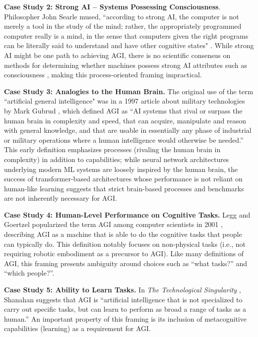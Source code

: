 \documentclass{article}
\theoremstyle{plain}
\theoremstyle{definition}
\theoremstyle{remark}
\begin{document}
\textbf{Case Study 2: Strong AI -- Systems Possessing Consciousness}. Philosopher John Searle mused, ``according to strong AI, the computer is not merely a tool in the study of the mind; rather, the appropriately programmed computer really is a mind, in the sense that computers given the right programs can be literally said to understand and have other cognitive states" \citep{searle_1980}. While strong AI might be one path to achieving AGI, there is no scientific consensus on methods for determining whether machines possess strong AI attributes such as consciousness \citep{butlin2023consciousness}, making this process-oriented framing impractical.  

\textbf{Case Study 3: Analogies to the Human Brain.} The original use of the term ``artificial general intelligence" was in a 1997 article about military technologies by Mark Gubrud \citep{gubrudAGI}, which defined AGI as “AI systems that rival or surpass the human brain in complexity and speed, that can acquire, manipulate and reason with general knowledge, and that are usable in essentially any phase of industrial or military operations where a human intelligence would otherwise be needed.” This early definition emphasizes processes (rivaling the human brain in complexity) in addition to capabilities; while neural network architectures underlying modern ML systems are loosely inspired by the human brain, the success of transformer-based architectures \citep{vaswani2023attention} whose performance is not reliant on human-like learning suggests that strict brain-based processes and benchmarks are not inherently necessary for AGI. 

\textbf{Case Study 4: Human-Level Performance on Cognitive Tasks.} Legg \citep{leggThesis} and Goertzel \citep{goertzel} popularized the term AGI among computer scientists in 2001 \citep{shaneTweet}, describing AGI as a machine that is able to do the cognitive tasks that people can typically do. This definition notably focuses on non-physical tasks (i.e., not requiring robotic embodiment as a precursor to AGI). Like many definitions of AGI, this framing presents ambiguity around choices such as “what tasks?” and “which people?”.

\textbf{Case Study 5: Ability to Learn Tasks.} In \textit{The Technological Singularity} \citep{murrayBook}, Shanahan suggests that AGI is “artificial intelligence that is not specialized to carry out specific tasks, but can learn to perform as broad a range of tasks as a human.” An important property of this framing is its 
inclusion of metacognitive capabilities (learning) as a requirement for AGI.
\end{document}
